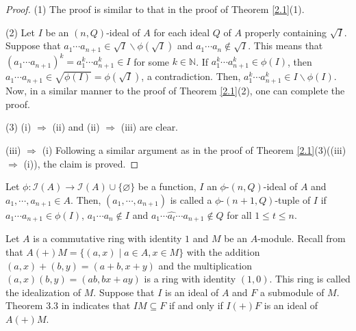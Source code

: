 \documentclass[preprint,review,10pt]{amsart}
\theoremstyle{definition}
\theoremstyle{remark}
\numberwithin{equation}{section}
\begin{document}
\begin{proof}
(1) The proof is similar to that in the proof of Theorem \ref{2.1}(1). 

(2) Let $I$ be  an $(n,Q)$-ideal of $A$ for each ideal $Q$ of $A$ properly containing $\sqrt{I}$. Suppose  that $a_1 \cdots a_{n+1} \in \sqrt{I} \backslash \phi(\sqrt{I})$ and $a_1 \cdots a_n \notin \sqrt{I}$. This means  that $(a_1 \cdots a_{n+1})^k=a_1^k \cdots a_{n+1}^k\in I$ for some $k \in \mathbb{N}$. If $a_1^k \cdots a_{n+1}^k \in \phi(I)$, then  $a_1  \cdots a_{n+1} \in \sqrt{\phi(I)} =\phi(\sqrt{I})$, a contradiction. Then, $a_1^k \cdots a_{n+1}^k \in I \backslash \phi(I)$. Now, in a similar manner to the proof of Theorem \ref{2.1}(2),  one can complete the proof.

(3) (i) $\Longrightarrow$ (ii) and (ii) $\Longrightarrow$ (iii) are clear.


(iii) $\Longrightarrow$ (i)  Following a similar argument as in the proof of Theorem \ref{2.1}(3)((iii) $\Longrightarrow$ (i)), the claim is proved.
\end{proof}
Let   $\phi: \mathcal{I}(A) \to \mathcal{I}(A) \cup \{\varnothing\}$ be a function, $I$  an $\phi$-$(n,Q)$-ideal of $A$ and $a_1,\cdots, a_{n+1} \in A$.  Then, $(a_1, \cdots, a_{n+1})$ is called a $\phi$-$(n+1,Q)$-tuple of $I$ if $a_1  \cdots  a_{n+1} \in \phi(I)$, $a_1  \cdots  a_n \notin I$ and $a_1  \cdots  \widehat{a_t} \cdots a_{n+1} \notin Q$ for all $1 \leq t \leq n$. 

Let     $A$ is  a commutative ring with identity $1$ and  $M$ be an $A$-module. Recall
from \cite{Anderson} that   $A(+)M=\{(a,x) \mid a \in A, x \in M\}$ with  the  addition  $ (a, x) + (b, y) = (a + b, x +y) $ and the multiplication   $(a, x)(b, y) = (ab, bx + ay)$  is a  ring with identity $(1, 0)$.  This   ring is called the idealization of  $M$. Suppose  that  $I$ is an ideal of $A$ and $F$ a submodule of $M$. Theorem 3.3 in \cite{Anderson} indicates  that  $IM \subseteq F$  if and only if $I(+)F$ is an ideal of $A(+)M$.
\end{document}
